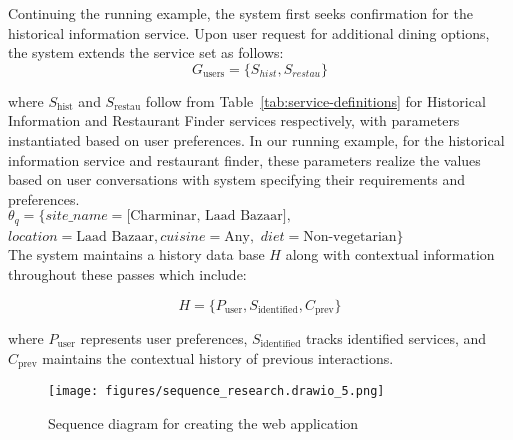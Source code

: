 Continuing the running example, the system first seeks confirmation for the historical information service. Upon user request for additional dining options, the system extends the service set as follows:
\[
G_{\text{users}} = \{ S_{hist},S_{restau}
\}
\]

where $S_{\text{hist}}$ and $S_{\text{restau}}$ follow from Table~\ref{tab:service-definitions} for Historical Information and Restaurant Finder services respectively, with parameters instantiated based on user preferences. In our running example, for the historical information service and restaurant finder, these parameters realize the values based on user conversations with system specifying their requirements and preferences.\\ 
\(
\theta_q = \{
site\_name = 
    \text{[Charminar} \text{, Laad Bazaar]},
\)
\(
location = 
    \text{Laad Bazaar}, 
cuisine = \text{Any},
\)
\(
diet=\text{Non-vegetarian}\}
\)
\\The system maintains a history data base $H$  along with contextual information throughout these passes which include:

\[
H = \{P_{\text{user}}, S_{\text{identified}}, C_{\text{prev}}\}
\]

where $P_{\text{user}}$ represents user preferences, $S_{\text{identified}}$ tracks identified services, and $C_{\text{prev}}$ maintains the contextual history of previous interactions.
\begin{figure*}[ht]
    \centering
    \texttt{[image: figures/sequence\_research.drawio\_5.png]}
    \label{sequence}
    \caption{Sequence diagram for creating the web application }
\end{figure*}
